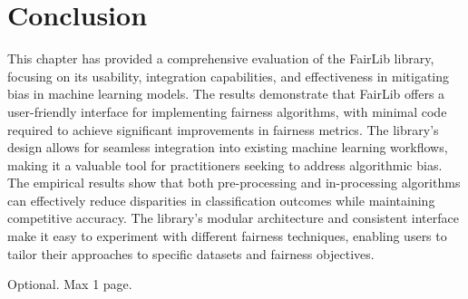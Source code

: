 \documentclass[12pt,a4paper,openright,twoside]{book}
\begin{document}
\section{Conclusion}
This chapter has provided a comprehensive evaluation of the FairLib library, focusing on its usability, integration capabilities, and effectiveness in mitigating bias in machine learning models. The results demonstrate that FairLib offers a user-friendly interface for implementing fairness algorithms, with minimal code required to achieve significant improvements in fairness metrics. The library's design allows for seamless integration into existing machine learning workflows, making it a valuable tool for practitioners seeking to address algorithmic bias. The empirical results show that both pre-processing and in-processing algorithms can effectively reduce disparities in classification outcomes while maintaining competitive accuracy. The library's modular architecture and consistent interface make it easy to experiment with different fairness techniques, enabling users to tailor their approaches to specific datasets and fairness objectives.





\backmatter

\nocite{*} %




\begin{acknowledgements} %
Optional. Max 1 page.
\end{acknowledgements}
\end{document}
